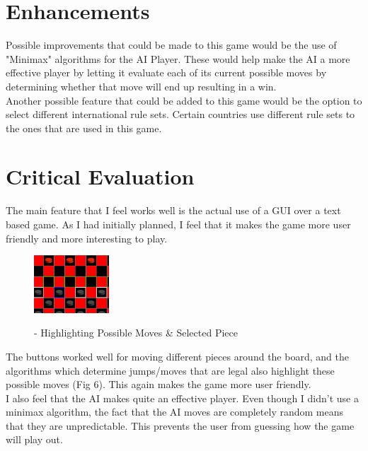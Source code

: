 \documentclass[10pt, a4paper]{article}
\begin{document}
\section{Enhancements}
Possible improvements that could be made to this game would be the use of "Minimax" algorithms for the AI Player.
\newline
These would help make the AI a more effective player by letting it evaluate each of its current possible moves by determining whether that move will end up resulting in a win.
\newline
\\
Another possible feature that could be added to this game would be the option to select different international rule sets. Certain countries use different rule sets to the ones that are used in this game.

\section{Critical Evaluation}
The main feature that I feel works well is the actual use of a GUI over a text based game.
\newline
As I had initially planned, I feel that it makes the game more user friendly and more interesting to play.
\begin{figure} %
\centering
  \includegraphics[width=0.25\textwidth]{Fig6}
  \label{fig:}
\caption{ - Highlighting Possible Moves \& Selected Piece}
\end{figure}
\newline
The buttons worked well for moving different pieces around the board, and the algorithms which determine jumps/moves that are legal also highlight these possible moves (Fig 6). This again makes the game more user friendly.
\\
I also feel that the AI makes quite an effective player. Even though I didn't use a minimax algorithm, the fact that the AI moves are completely random means that they are unpredictable.
\newline
This prevents the user from guessing how the game will play out.
\end{document}
